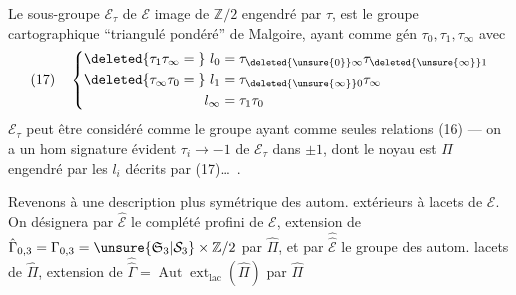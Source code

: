 Le sous-groupe $\mathcal E_\tau$ de $\mathcal E$ image  de $\mathbb Z/2$ engendré par $\tau$, est le groupe cartographique ``triangulé pondéré'' de Malgoire, ayant comme gén $\tau_0,\tau_1,\tau_\infty$  avec
\[
(17)\quad\left\{\begin{aligned}
\deleted{\tau_1\tau_\infty={}}\ l_0&=\tau_{\deleted{\unsure{0}}\infty}\tau_{\deleted{\unsure{\infty}}1}\\
\deleted{\tau_\infty\tau_0={}}\ l_1&=\tau_{\deleted{\unsure{\infty}}0}\tau_\infty\\
l_\infty&=\tau_1\tau_0
\end{aligned}\right.
\]
$\mathcal E_\tau$ peut être considéré comme le groupe ayant comme  seules relations (16) --- on a un hom signature évident $\tau_i\longrightarrow-1$ de $\mathcal E_\tau$ dans $\pm1$, dont le noyau est $\Pi$ engendré par les $l_i$ décrits par (17)\ldots\ .

Revenons à une description plus symétrique des autom. extérieurs à lacets de $\mathcal E$. On désignera par $\hat{\mathcal E}$ le complété profini de $\mathcal E$, extension de $\hat\Gamma_{0,3}=\Gamma_{0,3}=\unsure{\mathfrak S_3|\mathcal S_3}\times\mathbb Z/2$ par $\hat\Pi$, et par $\widehat{\widehat{\mathcal E}}$ le groupe des autom.   lacets de $\hat\Pi$, extension de $\widehat{\widehat\Gamma}=\operatorname{Aut}\operatorname{ext}_{\mathrm{lac}}(\hat\Pi)$ par $\hat\Pi$
